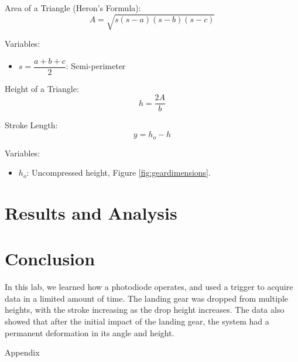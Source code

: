\documentclass{article}
\begin{document}
Area of a Triangle (Heron's Formula):
\begin{equation}
    A = \sqrt{s(s-a)(s-b)(s-c)}
\end{equation}

Variables:
\begin{itemize}
    \item \(s = \dfrac{a+b+c}{2}\): Semi-perimeter
\end{itemize}
\vspace{5mm}

Height of a Triangle:
\begin{equation}
    h = \dfrac{2A}{b}
\end{equation}

Stroke Length:
\begin{equation}
    y = h_{o} - h
\end{equation}

Variables:
\begin{itemize}
    \item \(h_{o}\): Uncompressed height, Figure \ref{fig:geardimensions}. 
\end{itemize}
\vspace{5mm}
\section{Results and Analysis}

 
\section{Conclusion}
In this lab, we learned how a photodiode operates, and used a trigger to acquire data in a limited amount of time.  The landing gear was dropped from multiple heights, with the stroke increasing as the drop height increases.  The data also showed that after the initial impact of the landing gear, the system had a permanent deformation in its angle and height.  


\newpage
\thispagestyle{empty}  %
\begin{center}
	\vspace*{\fill}
	{\Huge Appendix}
	\vspace*{\fill}
\end{center}
\end{document}
